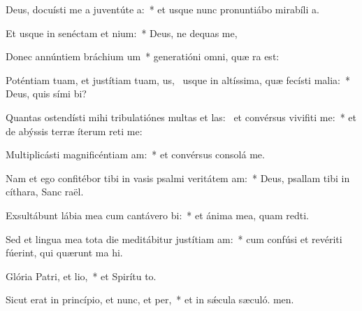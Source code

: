 \item Deus, docuísti me a juventúte a:~* et usque nunc pronuntiábo mirabíli a.
\item Et usque in senéctam et nium:~* Deus, ne dequas me,
\item Donec annúntiem bráchium um~* generatióni omni, quæ ra est:
\item Poténtiam tuam, et justítiam tuam, us,~\pscross{} usque in altíssima, quæ fecísti malia:~* Deus, quis sími bi?
\item Quantas ostendísti mihi tribulatiónes multas et las:~\pscross{} et convérsus vivifiti me:~* et de abýssis terræ íterum reti me:
\item Multiplicásti magnificéntiam am:~* et convérsus consolá  me.
\item Nam et ego confitébor tibi in vasis psalmi veritátem am:~* Deus, psallam tibi in cíthara, Sanc raël.
\item Exsultábunt lábia mea cum cantávero bi:~* et ánima mea, quam redti.
\item Sed et lingua mea tota die meditábitur justítiam am:~* cum confúsi et revériti fúerint, qui quærunt ma hi.
\item Glória Patri, et lio,~* et Spirítu to.
\item Sicut erat in princípio, et nunc, et per,~* et in sǽcula sæculó. men.
